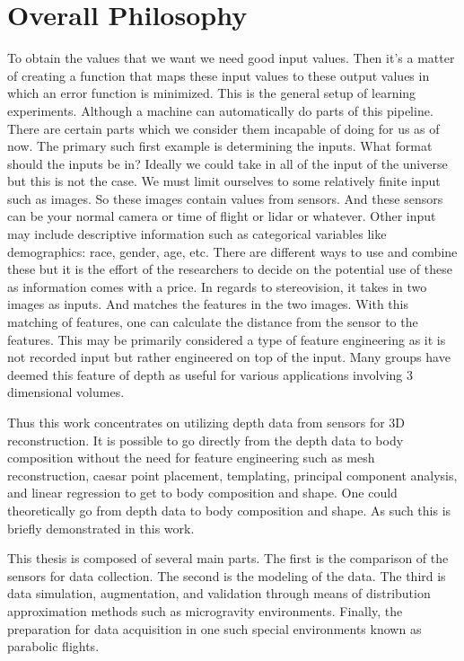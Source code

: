 \section{Overall Philosophy}
To obtain the values that we want we need good input values. Then it's a matter of creating a function that maps these input values to these output values in which an error function is minimized. 
This is the general setup of learning experiments. Although a machine can automatically do parts of this pipeline. There are certain parts which we consider them incapable of doing for us as of now. The primary such first example is determining the inputs. What format should the inputs be in? Ideally we could take in all of the input of the universe but this is not the case. We must limit ourselves to some relatively finite input such as images. So these images contain values from sensors. And these sensors can be your normal camera or time of flight or lidar or whatever. Other input may include descriptive information such as categorical variables like demographics: race, gender, age, etc. There are different ways to use and combine these but it is the effort of the researchers to decide on the potential use of these as information comes with a price. In regards to stereovision, it takes in two images as inputs. And matches the features in the two images. With this matching of features, one can calculate the distance from the sensor to the features. This may be primarily considered a type of feature engineering as it is not recorded input but rather engineered on top of the input. Many groups have deemed this feature of depth as useful for various applications involving 3 dimensional volumes.

Thus this work concentrates on utilizing depth data from sensors for 3D reconstruction. It is possible to go directly from the depth data to body composition without the need for feature engineering such as mesh reconstruction, caesar point placement, templating, principal component analysis, and linear regression to get to body composition and shape. One could theoretically go from depth data to body composition and shape. As such this is briefly demonstrated in this work.

This thesis is composed of several main parts. The first is the comparison of the sensors for data collection. The second is the modeling of the data. The third is data simulation, augmentation, and validation through means of distribution approximation methods such as microgravity environments. Finally, the preparation for data acquisition in one such special environments known as parabolic flights.
